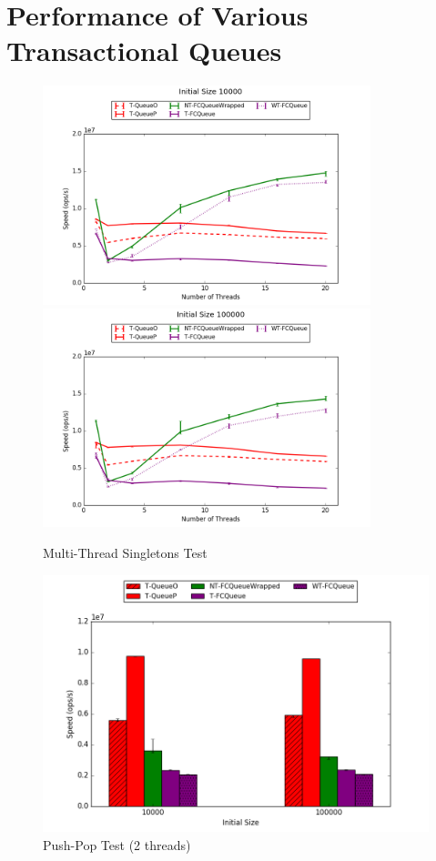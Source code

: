 \section{Performance of Various Transactional Queues}
\begin{figure}[H]
    \centering
    \includegraphics[width=0.85\textwidth]{fcqueues/allQ:RandSingleOps10000.png}
    \vspace{20pt}
    \includegraphics[width=0.85\textwidth]{fcqueues/allQ:RandSingleOps100000.png}
    \caption*{Multi-Thread Singletons Test}
\end{figure}
\begin{figure}[H]
    \centering
    \includegraphics[width=\textwidth]{fcqueues/allQ:PushPop.png}
    \caption*{Push-Pop Test (2 threads)}
\end{figure}

